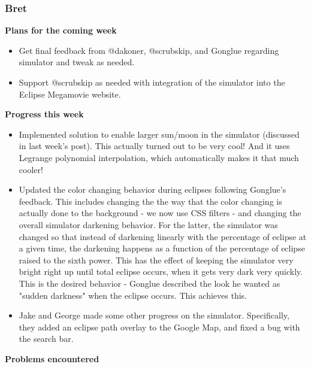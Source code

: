 \documentclass[10pt, onecolumn, draftclsnofoot, letterpaper, compsoc]{IEEEtran}
\begin{document}
    \subsubsection{Bret}

    \noindent \textbf{Plans for the coming week}

    \begin{itemize}

    \item Get final feedback from @dakoner, @scrubskip, and Gonglue regarding simulator and tweak as needed.
    \item Support @scrubskip as needed with integration of the simulator into the Eclipse Megamovie website.

    \end{itemize}

    \noindent \textbf{Progress this week}

    \begin{itemize}

    \item Implemented solution to enable larger sun/moon in the simulator (discussed in last week's post).
      This actually turned out to be very cool! And it uses Legrange polynomial interpolation, which automatically
      makes it that much cooler!
    \item Updated the color changing behavior during eclipses following Gonglue's feedback. This includes changing the
      the way that the color changing is actually done to the background - we now use CSS filters - and changing the
      overall simulator darkening behavior. For the latter, the simulator was changed so that instead of darkening
      linearly with the percentage of eclipse at a given time, the darkening happens as a function of the percentage
      of eclipse raised to the sixth power. This has the effect of keeping the simulator very bright right up until
      total eclipse occurs, when it gets very dark very quickly. This is the desired behavior - Gonglue described
      the look he wanted as "sudden darkness" when the eclipse occurs. This achieves this.
    \item Jake and George made some other progress on the simulator. Specifically, they added an eclipse path overlay to
      the Google Map, and fixed a bug with the search bar.

    \end{itemize}

    \noindent \textbf{Problems encountered}
\end{document}
